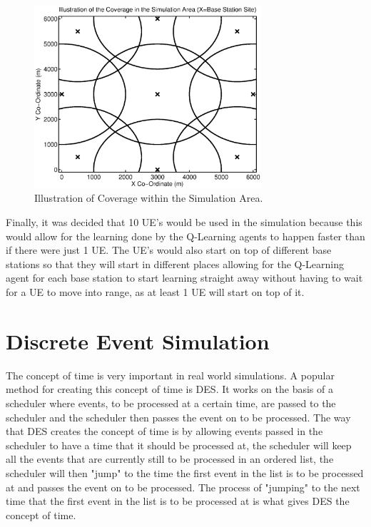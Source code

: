 \begin{figure}[H]
  \begin{center}
    	  \includegraphics[width=0.75\textwidth]{figures/simulation/coverage.eps}
    \end{center}
    \caption{Illustration of Coverage within the Simulation Area.}
    \label{fig:cov}
\end{figure}

Finally, it was decided that 10 UE’s would be used in the simulation because this would allow for the learning done by the Q-Learning agents to happen faster than if there were just 1 UE. The UE’s would also start on top of different base stations so that they will start in different places allowing for the Q-Learning agent for each base station to start learning straight away without having to wait for a UE to move into range, as at least 1 UE will start on top of it.
\section{Discrete Event Simulation}
The concept of time is very important in real world simulations. A popular method for creating this concept of time is \ac{DES}. It works on the basis of a scheduler where events, to be processed at a certain time, are passed to the scheduler and the scheduler then passes the event on to be processed. The way that \ac{DES} creates the concept of time is by allowing events passed in the scheduler to have a time that it should be processed at, the scheduler will keep all the events that are currently still to be processed in an ordered list, the scheduler will then "jump" to the time the first event in the list is to be processed at and passes the event on to be processed. The process of "jumping" to the next time that the first event in the list is to be processed at is what gives \ac{DES} the concept of time.

